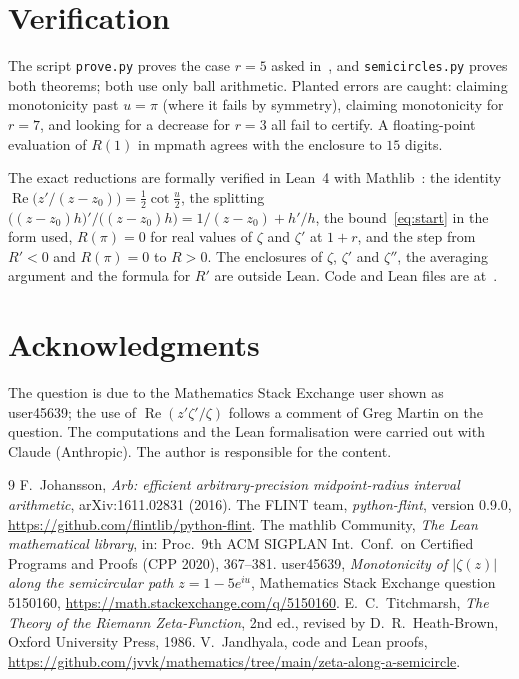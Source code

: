 \documentclass[11pt]{amsart}
\theoremstyle{remark}
\begin{document}
\section{Verification}

The script \texttt{prove.py} proves the case $r=5$ asked in~\cite{MSE}, and \texttt{semicircles.py} proves both theorems; both use only ball arithmetic. Planted errors are caught: claiming monotonicity past $u=\pi$ (where it fails by symmetry), claiming monotonicity for $r=7$, and looking for a decrease for $r=3$ all fail to certify. A floating-point evaluation of $R(1)$ in mpmath agrees with the enclosure to $15$ digits.

The exact reductions are formally verified in Lean~4 with Mathlib~\cite{mathlib}: the identity $\operatorname{Re}\bigl(z'/(z-z_0)\bigr)=\frac12\cot\frac u2$, the splitting $\bigl((z-z_0)h\bigr)'/\bigl((z-z_0)h\bigr)=1/(z-z_0)+h'/h$, the bound~\eqref{eq:start} in the form used, $R(\pi)=0$ for real values of $\zeta$ and $\zeta'$ at $1+r$, and the step from $R'<0$ and $R(\pi)=0$ to $R>0$. The enclosures of $\zeta$, $\zeta'$ and $\zeta''$, the averaging argument and the formula for $R'$ are outside Lean. Code and Lean files are at~\cite{repo}.

\section*{Acknowledgments}

The question is due to the Mathematics Stack Exchange user shown as user45639; the use of $\operatorname{Re}(z'\zeta'/\zeta)$ follows a comment of Greg Martin on the question. The computations and the Lean formalisation were carried out with Claude (Anthropic). The author is responsible for the content.

\begin{thebibliography}{9}
 F.~Johansson, \emph{Arb: efficient arbitrary-precision midpoint-radius interval arithmetic}, arXiv:1611.02831 (2016).
 The FLINT team, \emph{python-flint}, version 0.9.0, \url{https://github.com/flintlib/python-flint}.
 The mathlib Community, \emph{The Lean mathematical library}, in: Proc.\ 9th ACM SIGPLAN Int.\ Conf.\ on Certified Programs and Proofs (CPP 2020), 367--381.
 user45639, \emph{Monotonicity of $|\zeta(z)|$ along the semicircular path $z=1-5e^{iu}$}, Mathematics Stack Exchange question 5150160, \url{https://math.stackexchange.com/q/5150160}.
 E.~C.~Titchmarsh, \emph{The Theory of the Riemann Zeta-Function}, 2nd ed., revised by D.~R.~Heath-Brown, Oxford University Press, 1986.
 V.~Jandhyala, code and Lean proofs, \url{https://github.com/jvvk/mathematics/tree/main/zeta-along-a-semicircle}.
\end{thebibliography}
\end{document}

